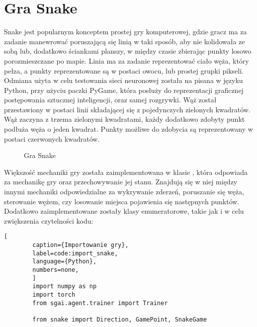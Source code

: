 


\section{Gra Snake}

Snake \cite{SnakeGame} jest popularnym konceptem prostej gry komputerowej, gdzie gracz ma za zadanie manewrować poruszającą się linią w taki sposób, aby nie kolidowała ze sobą lub, dodatkowo ściankami planszy, w między czasie zbierając punkty losowo porozmieszczane po mapie. Linia ma za zadanie reprezentować ciało węża, który pełza, a punkty reprezentowane są w postaci owocu, lub prostej grupki pikseli.
Odmiana użyta w celu testowania sieci neuronowej została na pisana w języku Python, przy użyciu paczki PyGame, która posłuży do reprezentacji graficznej postępowania sztucznej inteligencji, oraz samej rozgrywki.
Wąż został przestawiony w postaci linii składającej się z pojedynczych zielonych kwadratów. Wąż zaczyna z trzema zielonymi kwadratami, każdy dodatkowo zdobyty punkt podłuża węża o jeden kwadrat. Punkty możliwe do zdobycia są reprezentowany w postaci czerwonych kwadratów.

\begin{figure}[h!]
    \centering
    \caption{Gra Snake}
    \label{img:snake_game}
\end{figure}

\clearpage

Większość mechaniki gry została zaimplementowana w klasie , która odpowiada za mechanikę gry oraz przechowywanie jej stanu. Znajdują się w niej między innymi mechaniki odpowiedzialne za wykrywanie zderzeń, poruszanie się węża, sterowanie wężem, czy losowanie miejsca pojawienia się następnych punktów. Dodatkowo zaimplementowane zostały klasy enumeratorowe, takie jak  i  w celu zwiększenia czytelności kodu:

\begin{onepage}
    \begin{lstlisting}[
        caption={Importowanie gry},
        label=code:import_snake,
        language={Python},
        numbers=none,
        ]
        import numpy as np
        import torch
        from sgai.agent.trainer import Trainer
        
        from snake import Direction, GamePoint, SnakeGame
    \end{lstlisting}
\end{onepage}



